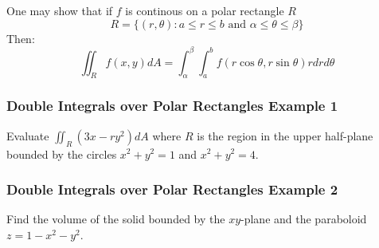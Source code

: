 \documentclass[12pt]{article}
\begin{document}
One may show that if \(f\) is continous on a polar rectangle \(R\)
\[
	R = \{(r,\theta): a\leq r \leq b \text{ and } \alpha \leq \theta \leq \beta \} 
\]
Then:
\[
	\iint_{R}f(x,y)dA = \int_{\alpha}^{\beta} \int_{a}^{b} f(r\cos\theta, r\sin\theta)rdrd\theta
\]

\subsubsection{Double Integrals over Polar Rectangles Example 1} 
Evaluate \(\iint_{R}(3x - ry^2)dA\) where \(R\) is the region in the upper half-plane bounded by the circles \(x^2 + y^2 = 1\) and \(x^2 + y^2 = 4\).

\subsubsection{Double Integrals over Polar Rectangles Example 2}
Find the volume of the solid bounded by the \(xy\)-plane and the paraboloid \(z = 1-x^2 -y^2\).
\end{document}
